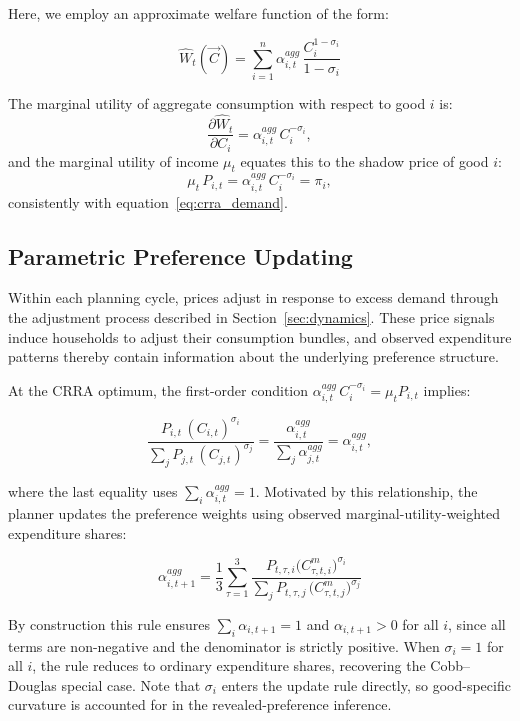 Here, we employ an approximate welfare function of the form:

\begin{equation}\label{eq:crra_welfare}
\hat{W}_t(\vec{C})
= \sum_{i=1}^n \alpha^{agg}_{i,t}
  \,\frac{C_{i}^{1-\sigma_i}}{1-\sigma_i}
\end{equation}

The marginal utility of aggregate consumption with respect to good $i$
is:
\[
\frac{\partial \hat{W}_t}{\partial C_i}
= \alpha^{agg}_{i,t}\, C_i^{-\sigma_i},
\]
and the marginal utility of income $\mu_t$ equates this to the shadow
price of good $i$:
\[
\mu_t \,P_{i,t} = \alpha^{agg}_{i,t}\, C_i^{-\sigma_i} = \pi_i,
\]
consistently with equation~\eqref{eq:crra_demand}.

\subsection{Parametric Preference Updating}

Within each planning cycle, prices adjust in response to excess demand
through the adjustment process described in Section~\ref{sec:dynamics}.
These price signals induce households to adjust their consumption
bundles, and observed expenditure patterns thereby contain information
about the underlying preference structure.

At the CRRA optimum, the first-order condition
$\alpha^{agg}_{i,t}\,C_i^{-\sigma_i} = \mu_t P_{i,t}$ implies:

\[
\frac{P_{i,t}\,(C_{i,t})^{\sigma_i}}{\displaystyle\sum_j P_{j,t}\,(C_{j,t})^{\sigma_j}}
= \frac{\alpha^{agg}_{i,t}}{\displaystyle\sum_j \alpha^{agg}_{j,t}}
= \alpha^{agg}_{i,t},
\]

where the last equality uses $\sum_i \alpha^{agg}_{i,t} = 1$.
Motivated by this relationship, the planner updates the preference
weights using observed marginal-utility-weighted expenditure shares:

\begin{equation} \label{eq:preference_update}
\alpha^{agg}_{i,t+1}
=
\frac{1}{3}\sum_{\tau = 1}^{3}
\frac{P_{t, \tau, i}\bigl(C^{m}_{\tau, t, i}\bigr)^{\sigma_i}}
     {\displaystyle\sum_j P_{t,\tau,j}\,\bigl(C^{m}_{\tau, t, j}\bigr)^{\sigma_j}}
\end{equation}

By construction this rule ensures $\sum_i \alpha_{i,t+1} = 1$ and
$\alpha_{i,t+1} > 0$ for all $i$, since all terms are non-negative and
the denominator is strictly positive. When $\sigma_i = 1$ for all
$i$, the rule reduces to ordinary expenditure shares, recovering the
Cobb--Douglas special case. Note that $\sigma_i$ enters the update
rule directly, so good-specific curvature is accounted for in the
revealed-preference inference.

